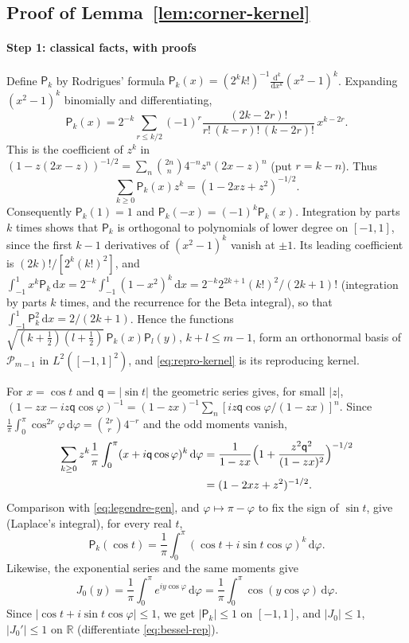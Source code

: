 \documentclass[preprint,12pt,a4paper]{elsarticle}
\theoremstyle{remark}
\newcommand{\R}{\mathbb R}
\newcommand{\dd}{\,\mathrm d}
\begin{document}
\subsection{Proof of Lemma~\ref{lem:corner-kernel}}\label{app:kernel}

\paragraph{Step 1: classical facts, with proofs}
Define $\mathsf P_k$ by Rodrigues' formula
$\mathsf P_k(x)=(2^kk!)^{-1}\frac{\mathrm d^k}{\mathrm dx^k}(x^2-1)^k$.
Expanding $(x^2-1)^k$ binomially and differentiating,
\[
 \mathsf P_k(x)=2^{-k}\sum_{r\le k/2}(-1)^r\frac{(2k-2r)!}{r!\,(k-r)!\,(k-2r)!}\,x^{k-2r}.
\]
This is the coefficient of $z^k$ in
$(1-z(2x-z))^{-1/2}=\sum_n\binom{2n}n4^{-n}z^n(2x-z)^n$ (put $r=k-n$). Thus
\begin{equation}\label{eq:legendre-gen}
 \sum_{k\ge0}\mathsf P_k(x)z^k=(1-2xz+z^2)^{-1/2}.
\end{equation}
Consequently $\mathsf P_k(1)=1$ and $\mathsf P_k(-x)=(-1)^k\mathsf P_k(x)$.
Integration by parts $k$ times shows that $\mathsf P_k$ is orthogonal to
polynomials of lower degree on $[-1,1]$, since the first $k-1$ derivatives of
$(x^2-1)^k$ vanish at $\pm1$. Its leading coefficient is
$(2k)!/[2^k(k!)^2]$, and
$\int_{-1}^1x^k\mathsf P_k\dd x=2^{-k}\int_{-1}^1(1-x^2)^k\dd x
=2^{-k}2^{2k+1}(k!)^2/(2k+1)!$ (integration by parts $k$ times, and the
recurrence for the Beta integral), so that
$\int_{-1}^1\mathsf P_k^2\dd x=2/(2k+1)$. Hence the functions
$\sqrt{(k+\frac12)(l+\frac12)}\,\mathsf P_k(x)\mathsf P_l(y)$, $k+l\le m-1$, form
an orthonormal basis of $\mathcal P_{m-1}$ in $L^2([-1,1]^2)$, and
\eqref{eq:repro-kernel} is its reproducing kernel.

For $x=\cos t$ and $\mathsf q=|\sin t|$ the geometric series gives, for small $|z|$,
$(1-zx-iz\mathsf q\cos\varphi)^{-1}=(1-zx)^{-1}\sum_n[iz\mathsf q\cos\varphi/(1-zx)]^n$.
Since $\frac1\pi\int_0^\pi\cos^{2r}\varphi\dd\varphi=\binom{2r}r4^{-r}$ and the odd
moments vanish,
\begin{align*}
 \sum_{k\ge0}z^k\frac1\pi\int_0^\pi(x+i\mathsf q\cos\varphi)^k\dd\varphi
 &=\frac1{1-zx}\Bigl(1+\frac{z^2\mathsf q^2}{(1-zx)^2}\Bigr)^{-1/2}\\
 &=(1-2xz+z^2)^{-1/2}.
\end{align*}
Comparison with \eqref{eq:legendre-gen}, and $\varphi\mapsto\pi-\varphi$ to
fix the sign of $\sin t$, give (Laplace's integral), for every real $t$,
\begin{equation}\label{eq:laplace}
 \mathsf P_k(\cos t)=\frac1\pi\int_0^\pi(\cos t+i\sin t\cos\varphi)^k\dd\varphi.
\end{equation}
Likewise, the exponential series and the same moments give
\begin{equation}\label{eq:bessel-rep}
 J_0(y)=\frac1\pi\int_0^\pi e^{iy\cos\varphi}\dd\varphi=\frac1\pi\int_0^\pi\cos(y\cos\varphi)\dd\varphi.
\end{equation}
Since $|\cos t+i\sin t\cos\varphi|\le1$, we get $|\mathsf P_k|\le1$ on $[-1,1]$,
and $|J_0|\le1$, $|J_0'|\le1$ on $\R$ (differentiate \eqref{eq:bessel-rep}).
\end{document}
